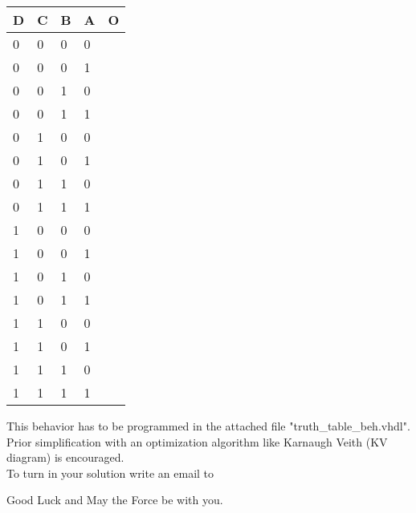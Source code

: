 \documentclass[a4paper,12pt]{article}
\begin{document}
\vspace{0.3cm}
\begin{center}
\begin{tabular}{||l | l | l | l || l||} 
	\hline
	D & C & B & A & O\\ [0.5ex] 
	\hline\hline
	0&0&0&0& %
	\\
	\hline
	0&0&0&1& %
	\\
	\hline
	0&0&1&0& %
	\\
	\hline
	0&0&1&1& %
	\\
	\hline\hline
	0&1&0&0& %
    \\
	\hline
	0&1&0&1& %
	\\
	\hline
	0&1&1&0& %
	\\
	\hline
	0&1&1&1& %
	\\
	\hline\hline
	1&0&0&0& %
	\\
	\hline
	1&0&0&1& %
	\\
	\hline
	1&0&1&0& %
	\\
	\hline
	1&0&1&1& %
	\\
	\hline\hline
	1&1&0&0& %
	\\
	\hline
	1&1&0&1& %
	\\
	\hline
	1&1&1&0& %
	\\
	\hline
	1&1&1&1& %
	\\
	\hline\hline
\end{tabular}
\end{center}

\vspace{0.3cm}

This behavior has to be programmed in the attached file "truth\_table\_beh.vhdl". Prior simplification with an
optimization algorithm like Karnaugh Veith (KV diagram) is encouraged.
\\

To turn in your solution write an email to %

\vspace{0.7cm}
Good Luck and May the Force be with you.
\end{document}

